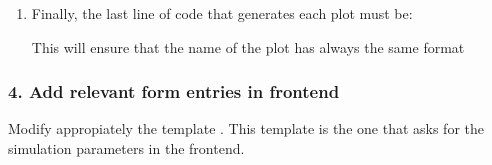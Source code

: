 \documentclass[a4paper,landscape,10pt,english]{sphinxmanual}
\begin{document}
\begin{enumerate}
\item {} 
Finally, the last line of code that generates each plot must be:

\begin{sphinxVerbatim}[commandchars=\\\{\}]
 
\end{sphinxVerbatim}

This will ensure that the name of the plot has always the same format

\end{enumerate}


\subsubsection{4. Add relevant form entries in frontend}
\label{\detokenize{code_docs/new_simulation:add-relevant-form-entries-in-frontend}}
Modify appropiately the template .
This template is the one that asks for the simulation parameters in the frontend.
\end{document}
